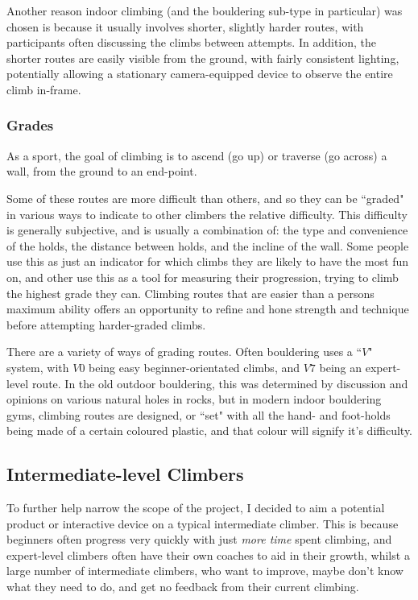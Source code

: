 Another reason indoor climbing (and the bouldering sub-type in particular) was chosen is because it usually involves shorter, slightly harder routes, with participants often discussing the climbs between attempts.
In addition, the shorter routes are easily visible from the ground, with fairly consistent lighting, potentially allowing a stationary camera-equipped device to observe the entire climb in-frame.



\subsubsection{Grades}
As a sport, the goal of climbing is to ascend (go up) or traverse (go across) a wall, from the ground to an end-point.

Some of these routes are more difficult than others, and so they can be ``graded" in various ways to indicate to other climbers the relative difficulty.
This difficulty is generally subjective, and is usually a combination of: the type and convenience of the holds, the distance between holds, and the incline of the wall.
Some people use this as just an indicator for which climbs they are likely to have the most fun on, and other use this as a tool for measuring their progression, trying to climb the highest grade they can.
Climbing routes that are easier than a persons maximum ability offers an opportunity to refine and hone strength and technique before attempting harder-graded climbs.

There are a variety of ways of grading routes.
Often bouldering uses a ``$V$" system, with $V0$ being easy beginner-orientated climbs, and $V7$ being an expert-level route.
In the old outdoor bouldering, this was determined by discussion and opinions on various natural holes in rocks, but in modern indoor bouldering gyms, climbing routes are designed, or ``set" with all the hand- and foot-holds being made of a certain coloured plastic, and that colour will signify it's difficulty.



\subsection{Intermediate-level Climbers}
To further help narrow the scope of the project, I decided to aim a potential product or interactive device on a typical intermediate climber.
This is because beginners often progress very quickly with just \textit{more time} spent climbing, and expert-level climbers often have their own coaches to aid in their growth, whilst a large number of intermediate climbers, who want to improve, maybe don't know what they need to do, and get no feedback from their current climbing.

